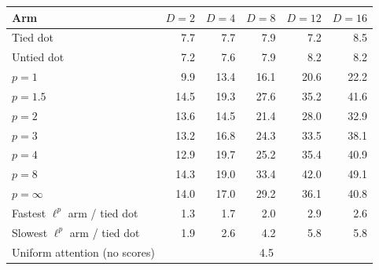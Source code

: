 \begin{tabular}{lrrrrr}
\toprule
Arm & $D=2$ & $D=4$ & $D=8$ & $D=12$ & $D=16$ \\
\midrule
Tied dot & 7.7 & 7.7 & 7.9 & 7.2 & 8.5 \\
Untied dot & 7.2 & 7.6 & 7.9 & 8.2 & 8.2 \\
$p=1$ & 9.9 & 13.4 & 16.1 & 20.6 & 22.2 \\
$p=1.5$ & 14.5 & 19.3 & 27.6 & 35.2 & 41.6 \\
$p=2$ & 13.6 & 14.5 & 21.4 & 28.0 & 32.9 \\
$p=3$ & 13.2 & 16.8 & 24.3 & 33.5 & 38.1 \\
$p=4$ & 12.9 & 19.7 & 25.2 & 35.4 & 40.9 \\
$p=8$ & 14.3 & 19.0 & 33.4 & 42.0 & 49.1 \\
$p=\infty$ & 14.0 & 17.0 & 29.2 & 36.1 & 40.8 \\
\midrule
Fastest $\ell^p$ arm / tied dot & 1.3 & 1.7 & 2.0 & 2.9 & 2.6 \\
Slowest $\ell^p$ arm / tied dot & 1.9 & 2.6 & 4.2 & 5.8 & 5.8 \\
\midrule
Uniform attention (no scores) & \multicolumn{5}{c}{4.5} \\
\bottomrule
\end{tabular}
